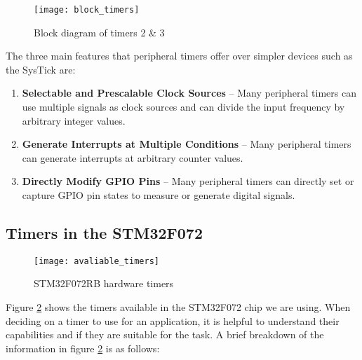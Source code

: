 \documentclass[11pt,fleqn]{book} %
\begin{document}
        \begin{figure}[]
            \centering\texttt{[image: block\_timers]}
            \caption{Block diagram of timers 2 \& 3}
            \label{block_timers}
        \end{figure}
        
        The three main features that peripheral timers offer over simpler devices such as the SysTick are:
        \begin{enumerate}
            \item \textbf{Selectable and Prescalable Clock Sources} -- Many peripheral timers can use multiple signals as clock sources and can divide the input frequency by arbitrary integer values. 
            \item \textbf{Generate Interrupts at Multiple Conditions} -- Many peripheral timers can generate interrupts at arbitrary counter values.
            \item \textbf{Directly Modify GPIO Pins} -- Many peripheral timers can directly set or capture GPIO pin states to measure or generate digital signals.  
        \end{enumerate}
        
	
    
    \subsection{Timers in the STM32F072}
        \begin{figure}[]
            \centering\texttt{[image: avaliable\_timers]}
            \caption{STM32F072RB hardware timers}
            \label{avaliable_timers}
        \end{figure}
        
        
        Figure \ref{avaliable_timers} shows the timers available in the STM32F072 chip we are using. When deciding on a timer to use for an application, it is helpful to understand their capabilities and if they are suitable for the task. A brief breakdown of the information in figure \ref{avaliable_timers} is as follows:
        
\end{document}
